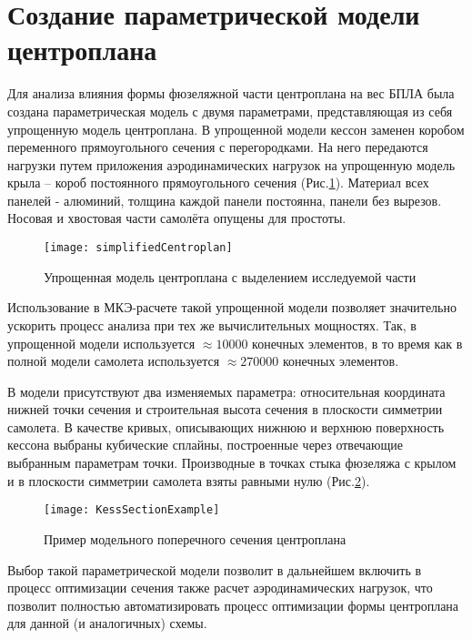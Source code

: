 \section{Создание параметрической модели центроплана}
\label{sec:creationOfModel}

Для анализа влияния формы фюзеляжной части центроплана на вес БПЛА была создана параметрическая модель с двумя параметрами, представляющая из себя упрощенную модель центроплана. В упрощенной модели кессон заменен коробом переменного прямоугольного сечения с перегородками. На него передаются нагрузки путем приложения аэродинамических нагрузок на упрощенную модель крыла -- короб постоянного прямоугольного сечения (Рис.\ref{fig:CurvedKessonPatran}). Материал всех панелей - алюминий, толщина каждой панели постоянна, панели без вырезов. Носовая и хвостовая части самолёта опущены для простоты.  



\begin{figure}[ht]
\centering
\texttt{[image: simplifiedCentroplan]}
\caption{Упрощенная модель центроплана с выделением исследуемой части}
\label{fig:CurvedKessonPatran}
\end{figure}

Использование в МКЭ-расчете такой упрощенной модели позволяет значительно ускорить процесс анализа при тех же вычислительных мощностях. Так, в упрощенной модели используется $\approx10000$ конечных элементов, в то время как в полной модели самолета используется $\approx270000$ конечных элементов.

В модели присутствуют два изменяемых параметра: относительная координата нижней точки сечения и строительная высота сечения в плоскости симметрии самолета. В качестве кривых, описывающих нижнюю и верхнюю поверхность кессона выбраны кубические сплайны, построенные через отвечающие выбранным параметрам точки. Производные в точках стыка фюзеляжа с крылом и в плоскости симметрии самолета взяты равными нулю (Рис.\ref{fig:KessSectionExample}).

\begin{figure}[ht]
\centering
\texttt{[image: KessSectionExample]}
%
\caption{Пример модельного поперечного сечения центроплана}
\label{fig:KessSectionExample}
\end{figure}


Выбор такой параметрической модели позволит в дальнейшем включить в процесс оптимизации сечения также расчет аэродинамических нагрузок, что позволит полностью автоматизировать процесс оптимизации формы центроплана для данной (и аналогичных) схемы. 

